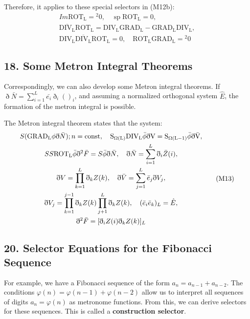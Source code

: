 \documentclass[11pt,a4paper,oneside]{article}
\DeclareMathOperator{\spn}{sp}
\newcommand{\ethop}{\eth}
\begin{document}
Therefore, it applies to these special selectors in (M12b):
\begin{equation}
    \begin{gathered}
    Im\mathrm{ROT_L} = {}^2 0,\quad \spn\mathrm{ROT_L} = 0, \\
    \overline{\mathrm{DIV_L}}\mathrm{ROT_L} = \mathrm{DIV_L}\mathrm{GRAD_L}-\mathrm{GRAD_L}\mathrm{DIV_L}, \\
    \mathrm{DIV_L} \overline{\mathrm{DIV_L}}\mathrm{ROT_L} = 0,\quad \mathrm{ROT_L}\mathrm{GRAD_L} = {}^2 0 
    \end{gathered} \tag {M12c}
\end{equation}

\subsection{18. Some Metron Integral Theorems}
Correspondingly, we can also develop some Metron integral theorems. If $\ethop\bar {N} = \sum_{i = 1}^L \bar {e_i}\ethop_i()_i$, and assuming a normalized orthogonal system $\hat{E}$, the formation of the metron integral is possible.

The Metron integral theorem states that the system:
\begin{equation}
    \begin{gathered}
    S(\mathrm{GRAD_L} \phi \ethop\bar {N}); n = \rm{const},\quad S_{\Omega(L)} \mathrm{DIV_L} \bar {\phi}\ethop V = S_{\Omega(L-1)} \bar {\phi}\ethop\bar {V}, \\
    SS \mathrm{ROT_L} \bar {\phi}\ethop^2 \bar {F} = S \bar {\phi}\ethop\bar {N},\quad \ethop\bar {N} = \sum_{i = 1}^L\ethop_i\bar {Z}(i), \\
    \ethop V= \prod_{k = 1}^L\ethop_kZ(k),\quad \ethop\bar {V} = \sum_{j = 1}^L \bar {e}_j\ethop V_j , \\
    \ethop V_j= \prod_{k = 1}^{j-1}\ethop_kZ(k)\prod_{j + 1}^L\ethop_kZ(k),\quad (\bar {e}_i \bar {e }_k)_L = \hat {E}, \\
    \ethop^2 \bar {F} = [\ethop_iZ(i)\ethop_kZ(k)]_L 
    \end{gathered} \tag {M13}
\end{equation}

\subsection{20. Selector Equations for the Fibonacci Sequence}
For example, we have a Fibonacci sequence of the form $a_n = a_{n-1} + a_{n-2}$.
The conditions $\varphi(n) = \varphi(n-1) + \varphi(n-2)$ allow us to interpret all sequences of digits $a_n = \varphi(n)$ as metronome functions. From this, we can derive selectors for these sequences. This is called a \textbf{construction selector}.
\end{document}
